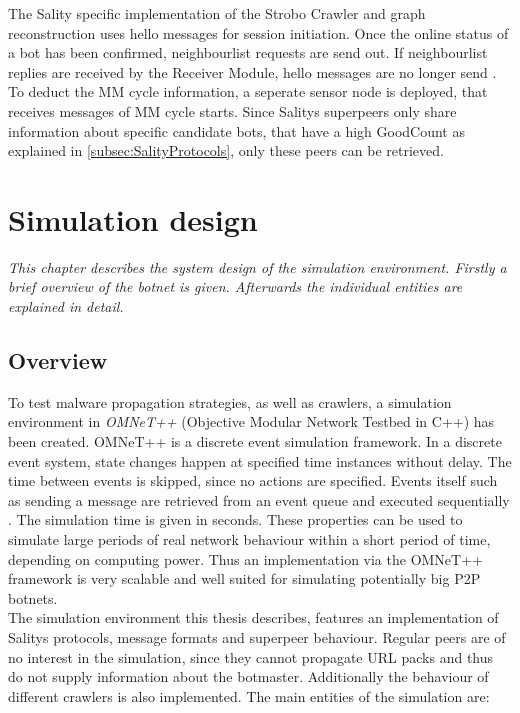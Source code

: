 \documentclass{article}
\begin{document}
The Sality specific implementation of the Strobo Crawler and graph reconstruction uses hello messages for session initiation. Once the online status of a bot has been confirmed, neighbourlist requests are send out. If neighbourlist replies are received by the Receiver Module, hello messages are no longer send \cite{haas2016resilience}. To deduct the MM cycle information, a seperate sensor node is deployed, that receives messages of MM cycle starts. Since Salitys superpeers only share information about specific candidate bots, that have a high GoodCount as explained in \ref{subsec:SalityProtocols}, only these peers can be retrieved. 

\section{Simulation design} \label{System Design}
\emph{This chapter describes the system design of the simulation environment. Firstly a brief overview of the botnet is given. Afterwards the individual entities are explained in detail.} \\

\subsection{Overview}
To test malware propagation strategies, as well as crawlers, a simulation environment in \emph{OMNeT++} (Objective Modular Network Testbed in C++) has been created. OMNeT++ is a discrete event simulation framework. In a discrete event system, state changes happen at specified time instances without delay. The time between events is skipped, since no actions are specified. Events itself such as sending a message are retrieved from an event queue and executed sequentially \cite{vargaOmnet++}. The simulation time is given in seconds. These properties can be used to simulate large periods of real network behaviour within a short period of time, depending on computing power. Thus an implementation via the OMNeT++ framework is very scalable and well suited for simulating potentially big P2P botnets. \\

The simulation environment this thesis describes, features an implementation of Salitys protocols, message formats and superpeer behaviour. Regular peers are of no interest in the simulation, since they cannot propagate URL packs and thus do not supply information about the botmaster. Additionally the behaviour of different crawlers is also implemented.
The main entities of the simulation are:
\end{document}
